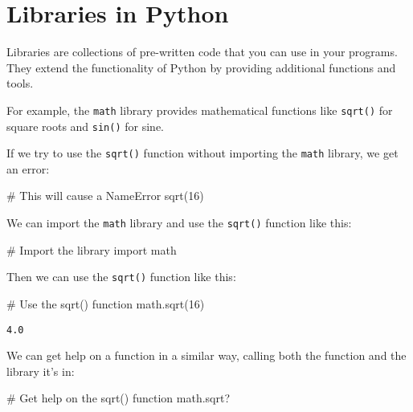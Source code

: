 \documentclass[
  letterpaper,
  DIV=11,
  numbers=noendperiod]{scrreprt}
\newenvironment{Shaded}{\begin{snugshade}}{\end{snugshade}}
\newcommand{\CommentTok}[1]{\textcolor[rgb]{0.37,0.37,0.37}{#1}}
\newcommand{\DecValTok}[1]{\textcolor[rgb]{0.68,0.00,0.00}{#1}}
\newcommand{\ImportTok}[1]{\textcolor[rgb]{0.00,0.46,0.62}{#1}}
\newcommand{\NormalTok}[1]{\textcolor[rgb]{0.00,0.23,0.31}{#1}}
\begin{document}
\section{Libraries in Python}\label{libraries-in-python}

Libraries are collections of pre-written code that you can use in your
programs. They extend the functionality of Python by providing
additional functions and tools.

For example, the \texttt{math} library provides mathematical functions
like \texttt{sqrt()} for square roots and \texttt{sin()} for sine.

If we try to use the \texttt{sqrt()} function without importing the
\texttt{math} library, we get an error:

\begin{Shaded}
\begin{Highlighting}[]
\CommentTok{\# This will cause a NameError}
\NormalTok{sqrt(}\DecValTok{16}\NormalTok{)}
\end{Highlighting}
\end{Shaded}

We can import the \texttt{math} library and use the \texttt{sqrt()}
function like this:

\begin{Shaded}
\begin{Highlighting}[]
\CommentTok{\# Import the library}
\ImportTok{import}\NormalTok{ math}
\end{Highlighting}
\end{Shaded}

Then we can use the \texttt{sqrt()} function like this:

\begin{Shaded}
\begin{Highlighting}[]
\CommentTok{\# Use the sqrt() function}
\NormalTok{math.sqrt(}\DecValTok{16}\NormalTok{)}
\end{Highlighting}
\end{Shaded}

\begin{verbatim}
4.0
\end{verbatim}

We can get help on a function in a similar way, calling both the
function and the library it's in:

\begin{Shaded}
\begin{Highlighting}[]
\CommentTok{\# Get help on the sqrt() function}
\NormalTok{math.sqrt?}
\end{Highlighting}
\end{Shaded}
\end{document}
